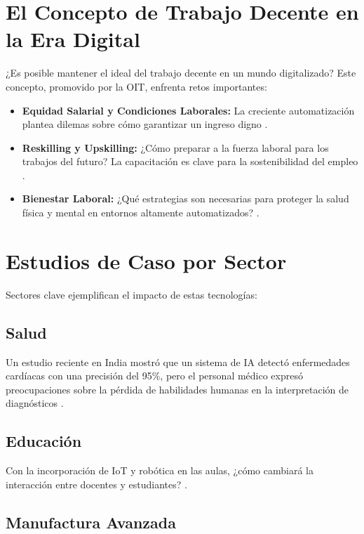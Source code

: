 \begin{refsection}
\section{El Concepto de Trabajo Decente en la Era Digital}
¿Es posible mantener el ideal del trabajo decente en un mundo digitalizado? Este concepto, promovido por la OIT, enfrenta retos importantes:
\begin{itemize}
    \item \textbf{Equidad Salarial y Condiciones Laborales:} La creciente automatización plantea dilemas sobre cómo garantizar un ingreso digno \cite{WOS:000691461300001}.
    \item \textbf{Reskilling y Upskilling:} ¿Cómo preparar a la fuerza laboral para los trabajos del futuro? La capacitación es clave para la sostenibilidad del empleo \cite{WOS:001235231900001}.
    \item \textbf{Bienestar Laboral:} ¿Qué estrategias son necesarias para proteger la salud física y mental en entornos altamente automatizados? \cite{WOS:000569348200001}.
\end{itemize}

\section{Estudios de Caso por Sector}
Sectores clave ejemplifican el impacto de estas tecnologías:

\subsection{Salud}

Un estudio reciente en India mostró que un sistema de IA detectó enfermedades cardíacas con una precisión del 95\%, pero el personal médico expresó preocupaciones sobre la pérdida de habilidades humanas en la interpretación de diagnósticos \cite{WOS:000701263900009}.


\subsection{Educación}
Con la incorporación de IoT y robótica en las aulas, ¿cómo cambiará la interacción entre docentes y estudiantes? \cite{WOS:001172649500001}.

\subsection{Manufactura Avanzada}


\end{refsection}
